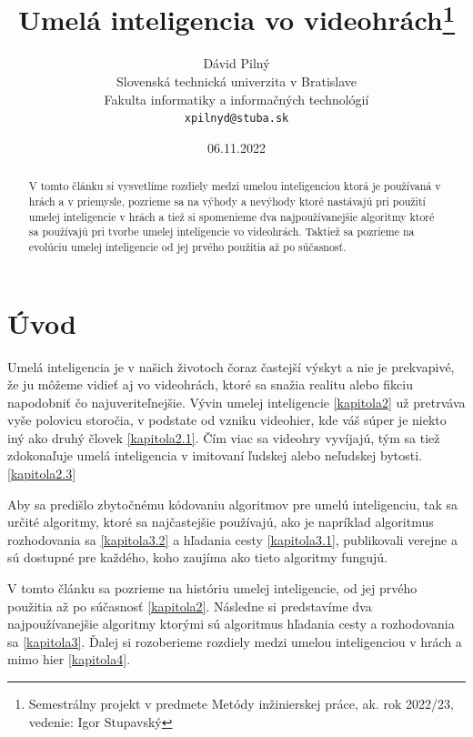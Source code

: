 \documentclass[10pt,oneside,slovak,a4paper]{article}
\title{Umelá inteligencia vo videohrách\thanks{Semestrálny projekt v predmete Metódy inžinierskej práce, ak. rok 2022/23, vedenie: Igor Stupavský}} %
\author{Dávid Pilný\\[2pt]
	{\small Slovenská technická univerzita v Bratislave}\\
	{\small Fakulta informatiky a informačných technológií}\\
	{\small \texttt{xpilnyd@stuba.sk}}
	}
\date{\small 06.11.2022} %
\begin{document}
\maketitle

\begin{abstract}
V tomto článku si vysvetlíme rozdiely medzi umelou inteligenciou ktorá je používaná v hrách a v priemysle, pozrieme sa na výhody a nevýhody ktoré nastávajú pri použití umelej inteligencie v hrách a tiež si spomenieme dva najpoužívanejšie algoritmy ktoré sa používajú pri tvorbe umelej inteligencie vo videohrách. Taktiež sa pozrieme na evolúciu umelej inteligencie od jej prvého použitia až po súčasnosť.
\end{abstract}


\section{Úvod} \label{kapitola1}
Umelá inteligencia je v našich životoch čoraz častejší výskyt a nie je prekvapivé, že ju môžeme vidieť aj vo videohrách, ktoré sa snažia realitu alebo fikciu napodobniť čo najuveriteľnejšie. Vývin umelej inteligencie \ref{kapitola2} už pretrváva vyše polovicu storočia, v podstate od vzniku videohier, kde váš súper je niekto iný ako druhý človek \ref{kapitola2.1}. Čím viac sa videohry vyvíjajú, tým sa tiež zdokonaľuje umelá inteligencia v imitovaní ľudskej alebo neľudskej bytosti. \ref{kapitola2.3}

Aby sa predišlo zbytočnému kódovaniu algoritmov pre umelú inteligenciu, tak sa určité algoritmy, ktoré sa najčastejšie používajú, ako je napríklad algoritmus rozhodovania sa \ref{kapitola3.2} a hľadania cesty \ref{kapitola3.1}, publikovali verejne a sú dostupné pre každého, koho zaujíma ako tieto algoritmy fungujú.

V tomto článku sa pozrieme na históriu umelej inteligencie, od jej prvého použitia až po súčasnosť \ref{kapitola2}. Následne si predstavíme dva najpoužívanejšie algoritmy ktorými sú algoritmus hľadania cesty a rozhodovania sa \ref {kapitola3}. Ďalej si rozoberieme rozdiely medzi umelou inteligenciou v hrách a mimo hier \ref{kapitola4}.
\end{document}

